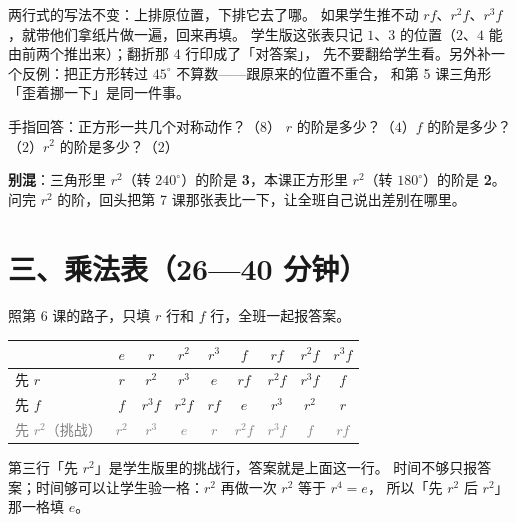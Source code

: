 \begin{zhu}
  两行式的写法不变：上排原位置，下排它去了哪。
  如果学生推不动 \(rf\)、\(r^2f\)、\(r^3f\)，就带他们拿纸片做一遍，回来再填。
  学生版这张表只记 \(1\)、\(3\) 的位置（\(2\)、\(4\) 能由前两个推出来）；翻折那 \(4\) 行印成了「对答案」，
  先不要翻给学生看。另外补一个反例：把正方形转过 \(45^\circ\) 不算数——跟原来的位置不重合，
  和第 5 课三角形「歪着挪一下」是同一件事。
\end{zhu}

\begin{caozuo}
  手指回答：正方形一共几个对称动作？（\(8\)）
  \(r\) 的阶是多少？（\(4\)）\(f\) 的阶是多少？（\(2\)）\(r^2\) 的阶是多少？（\(2\)）
\end{caozuo}

\begin{zhu}
  \textbf{别混}：三角形里 \(r^2\)（转 \(240^\circ\)）的阶是 \textbf{3}，本课正方形里 \(r^2\)（转 \(180^\circ\)）的阶是 \textbf{2}。
  问完 \(r^2\) 的阶，回头把第 7 课那张表比一下，让全班自己说出差别在哪里。
\end{zhu}

\section*{三、乘法表（26—40 分钟）}

\begin{caozuo}
  照第 6 课的路子，只填 \(r\) 行和 \(f\) 行，全班一起报答案。
\end{caozuo}

\begin{center}
\begin{tabular}{@{}l|cccccccc@{}}
  \toprule
   & \(e\) & \(r\) & \(r^2\) & \(r^3\) & \(f\) & \(rf\) & \(r^2f\) & \(r^3f\) \\
  \midrule
  先 \(r\) & \(r\) & \(r^2\) & \(r^3\) & \(e\) & \(rf\) & \(r^2f\) & \(r^3f\) & \(f\) \\
  先 \(f\) & \(f\) & \(r^3f\) & \(r^2f\) & \(rf\) & \(e\) & \(r^3\) & \(r^2\) & \(r\) \\
  \midrule
  \textcolor{gray}{先 \(r^2\)（挑战）} & \textcolor{gray}{\(r^2\)} & \textcolor{gray}{\(r^3\)} & \textcolor{gray}{\(e\)} & \textcolor{gray}{\(r\)} & \textcolor{gray}{\(r^2f\)} & \textcolor{gray}{\(r^3f\)} & \textcolor{gray}{\(f\)} & \textcolor{gray}{\(rf\)} \\
  \bottomrule
\end{tabular}
\end{center}

\begin{zhu}
  第三行「先 \(r^2\)」是学生版里的挑战行，答案就是上面这一行。
  时间不够只报答案；时间够可以让学生验一格：\(r^2\) 再做一次 \(r^2\) 等于 \(r^4=e\)，
  所以「先 \(r^2\) 后 \(r^2\)」那一格填 \(e\)。
\end{zhu}

